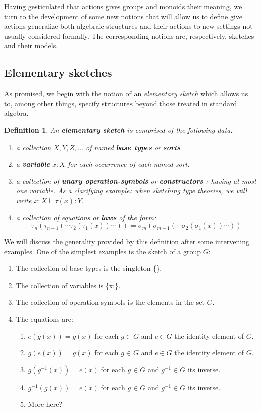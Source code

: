 \documentclass[12pt,twoside]{reedthesis}
\newtheorem{definition}{Definition}
\begin{document}
Having gesticulated that actions gives groups and monoids their meaning, we turn
to the development of some new notions that will allow us to define give actions
generalize both algebraic structures and their actions to new settings not
usually considered formally. %
The corresponding notions are, respectively, sketches and their models.

\subsection{Elementary sketches}
As promised, we begin with the notion of an \emph{elementary sketch} which
allows us to, among other things, specify structures beyond those treated in
standard algebra.
\begin{definition}
  An \textbf{elementary sketch} is comprised of the following data:
  \begin{enumerate}
    \item a collection \(X, Y, Z, \dots \) of named \textbf{base types} or
          \textbf{sorts}
    \item a \textbf{variable} \(x:X\) for each occurrence of each named sort.
    \item a collection of \textbf{unary operation-symbols} or
          \textbf{constructors} \(\tau\) having at most one variable. As a
          clarifying example: when sketching type theories, we will write
          \( x:X \vdash \tau(x) : Y \).
    \item a collection of equations or \textbf{laws} of the
          form: \[ \tau_n (\tau_{n-1}(\cdots \tau_2 (\tau_1 (x))\cdots )) = \sigma_m (\sigma_{m-1}(\cdots \sigma_2 (\sigma_1 (x))\cdots )) \]
  \end{enumerate}
\end{definition}
We will discuss the generality provided by this definition after some
intervening examples. One of the simplest examples is the sketch of a group $G$:
\begin{enumerate}
  \item The collection of base types is the singleton \{\star\}.
  \item The collection of variables is \{x:\star\}.
  \item The collection of operation symbols is the elements in the set $G$.
  \item The equations are:
    \begin{enumerate}
      \item \( e(g(x)) = g(x) \) for each \( g \in G \) and \( e \in G \) the identity element of \( G \).
      \item \( g(e(x)) = g(x) \) for each \( g \in G \) and \( e \in G \) the identity element of \( G \).
      \item \( g(g^{-1}(x)) = e(x) \) for each \( g \in G \) and \( g^{-1} \in G \) its inverse.
      \item \( g^{-1}(g(x)) = e(x) \) for each \( g \in G \) and \( g^{-1} \in G \) its inverse.
      \item More here?
    \end{enumerate}
  \end{enumerate}
\end{document}
